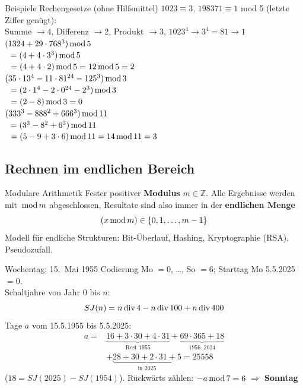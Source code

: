 \documentclass[a4paper, fontsize=7pt]{scrartcl}
\def\Z{\mathbb{Z}}  %
\newcommand{\Div}{\mskip3mu\mathrm{div}\mskip3mu}
\newcommand{\Mod}{\mskip3mu\mathrm{mod}\mskip3mu}
\begin{document}
\begin{subbox}{Beispiele Rechengesetze (ohne Hilfsmittel)}
$1023 \equiv 3$, $198371 \equiv 1$ mod 5 (letzte Ziffer genügt):\\
Summe $\to 4$, Differenz $\to 2$, Produkt $\to 3$,
$1023^4 \to 3^4 = 81 \to 1$\\[2pt]
$(1324 + 29 \cdot 768^3) \Mod 5$\\
$\phantom{(}= (4 + 4 \cdot 3^3) \Mod 5$\\
$\phantom{(}= (4 + 4 \cdot 2) \Mod 5 = 12 \Mod 5 = 2$\\[2pt]
$(35 \cdot 13^4 - 11 \cdot 81^{24} - 125^3) \Mod 3$\\
$\phantom{(}= (2 \cdot 1^4 - 2 \cdot 0^{24} - 2^3) \Mod 3$\\
$\phantom{(}= (2 - 8) \Mod 3 = 0$\\[2pt]
$(333^3 - 888^2 + 666^3) \Mod 11$\\
$\phantom{(}= (3^3 - 8^2 + 6^3) \Mod 11$\\
$\phantom{(}= (5 - 9 + 3 \cdot 6) \Mod 11 = 14 \Mod 11 = 3$
\end{subbox}

\subsection{Rechnen im endlichen Bereich}

\begin{mainbox}{Modulare Arithmetik}
Fester positiver \textbf{Modulus} $m \in \Z$. Alle Ergebnisse werden mit
$\Mod m$ abgeschlossen, Resultate sind also immer in der
\textbf{endlichen Menge}
$$(x \Mod m) \in \{0, 1, \ldots, m-1\}$$
Modell für endliche Strukturen: Bit-Überlauf, Hashing, Kryptographie (RSA),
Pseudozufall.
\end{mainbox}

\begin{subbox}{Wochentag: 15.\ Mai 1955}
Codierung Mo $= 0$, \ldots, So $= 6$; Starttag Mo 5.5.2025 $= 0$.\\
Schaltjahre von Jahr 0 bis $n$:
$$SJ(n) = n \Div 4 - n \Div 100 + n \Div 400$$
Tage $a$ vom 15.5.1955 bis 5.5.2025:
\begin{align*}
a ={}& \underbrace{16 + 3 \cdot 30 + 4 \cdot 31}_{\text{Rest 1955}}
  + \underbrace{69 \cdot 365 + 18}_{1956..2024}\\
  &+ \underbrace{28 + 30 + 2 \cdot 31 + 5}_{\text{in 2025}} = 25558
\end{align*}
($18 = SJ(2025) - SJ(1954)$). Rückwärts zählen:
$-a \Mod 7 = 6$ $\Rightarrow$ \textbf{Sonntag}
\end{subbox}
\end{document}
